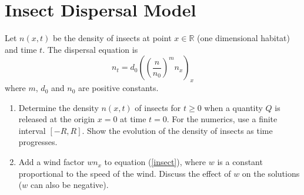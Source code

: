 \documentclass[12pt]{article}
\def\R{\mathbb{R}}
\newcommand{\be}{\begin{equation}}
\newcommand{\ee}{\end{equation}}
\begin{document}
\section{Insect Dispersal Model}\label{biol_models}

Let $n(x,t)$ be the density of insects at point $x\in\R$ (one dimensional habitat) and time $t$. The dispersal equation is
\be\label{insect} n_t=d_0\left((\frac{n}{n_0})^mn_x\right)_x \ee
where $m$, $d_0$ and $n_0$ are positive constants.


\begin{enumerate}\item Determine the density $n(x,t)$ of insects for $t\geq 0$ when a quantity $Q$ is released
at the origin $x=0$ at time $t=0$. For the numerics, use a finite interval $[-R,R]$.
Show the evolution of the density of insects as time progresses. 
\item Add a wind factor $w n_x$ to equation (\ref{insect}), where $w$ is a constant proportional to the speed of the wind.
Discuss the effect of $w$ on the solutions ($w$ can also be negative). 
\end{enumerate}
\end{document}
